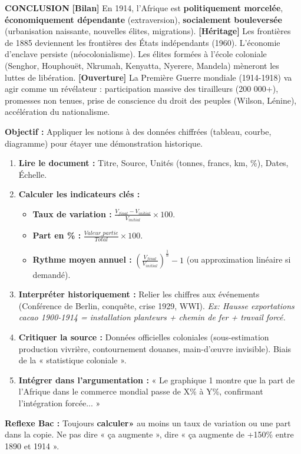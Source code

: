 \documentclass[11pt]{article}
\newcommand{\cle}[1]{{\popxbold\color{popdark}#1}}
\begin{document}
\begin{exoresolu}
\textbf{CONCLUSION}
\textbf{[Bilan]} En 1914, l'Afrique est \textbf{politiquement morcelée}, \textbf{économiquement dépendante} (extraversion), \textbf{socialement bouleversée} (urbanisation naissante, nouvelles élites, migrations).
\textbf{[Héritage]} Les frontières de 1885 deviennent les frontières des États indépendants (1960). L'économie d'enclave persiste (néocolonialisme). Les élites formées à l'école coloniale (Senghor, Houphouët, Nkrumah, Kenyatta, Nyerere, Mandela) mèneront les luttes de libération.
\textbf{[Ouverture]} La \cle{Première Guerre mondiale} (1914-1918) va agir comme un révélateur : participation massive des tirailleurs (200 000+), promesses non tenues, prise de conscience du droit des peuples (Wilson, Lénine), accélération du nationalisme.
\end{exoresolu}

\begin{methode}
\textbf{Objectif :} Appliquer les notions à des données chiffrées (tableau, courbe, diagramme) pour étayer une démonstration historique.
\begin{enumerate}
    \item \textbf{Lire le document :} Titre, Source, Unités (tonnes, francs, km, \%), Dates, Échelle.
    \item \textbf{Calculer les indicateurs clés :}
        \begin{itemize}
            \item \textbf{Taux de variation :} $\frac{V_{final} - V_{initial}}{V_{initial}} \times 100$.
            \item \textbf{Part en \% :} $\frac{Valeur\_partie}{Total} \times 100$.
            \item \textbf{Rythme moyen annuel :} $\left(\frac{V_{final}}{V_{initial}}\right)^{\frac{1}{n}} - 1$ (ou approximation linéaire si demandé).
        \end{itemize}
    \item \textbf{Interpréter historiquement :} Relier les chiffres aux événements (Conférence de Berlin, conquête, crise 1929, WWI). \emph{Ex: Hausse exportations cacao 1900-1914 = installation planteurs + chemin de fer + travail forcé.}
    \item \textbf{Critiquer la source :} Données officielles coloniales (sous-estimation production vivrière, contournement douanes, main-d'œuvre invisible). Biais de la « statistique coloniale ».
    \item \textbf{Intégrer dans l'argumentation :} « Le graphique 1 montre que la part de l'Afrique dans le commerce mondial passe de X\% à Y\%, confirmant l'intégration forcée... »
\end{enumerate}
\textbf{Reflexe Bac :} Toujours \textbf{calculer»} au moins un taux de variation ou une part dans la copie. Ne pas dire « ça augmente », dire « ça augmente de +150\% entre 1890 et 1914 ».
\end{methode}
\end{document}
